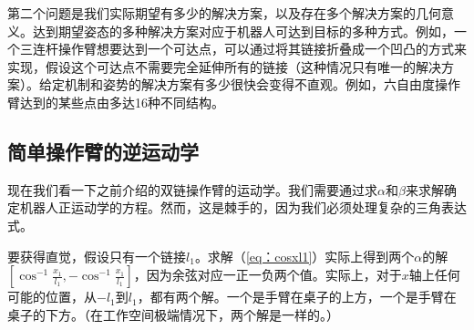 第二个问题是我们实际期望有多少的解决方案，以及存在多个解决方案的几何意义。达到期望姿态的多种解决方案对应于机器人可达到目标的多种方式。例如，一个三连杆操作臂想要达到一个可达点，可以通过将其链接折叠成一个凹凸的方式来实现，假设这个可达点不需要完全延伸所有的链接（这种情况只有唯一的解决方案）。给定机制和姿势的解决方案有多少很快会变得不直观。例如，六自由度操作臂达到的某些点由多达16种不同结构。



\subsection{简单操作臂的逆运动学}
现在我们看一下之前介绍的双链操作臂的运动学。我们需要通过求$\alpha$和$\beta$来求解确定机器人正运动学的方程。然而，这是棘手的，因为我们必须处理复杂的三角表达式。

要获得直觉，假设只有一个链接$l_1$。求解（\ref{eq：cosxl1}）实际上得到两个$\alpha$的解$\left[\cos^{-1}\frac{x_1}{l_1},-\cos^{-1}\frac{x_1}{l_1}\right]$，因为余弦对应一正一负两个值。实际上，对于$x$轴上任何可能的位置，从$-l_1$到$l_1$，都有两个解。一个是手臂在桌子的上方，一个是手臂在桌子的下方。（在工作空间极端情况下，两个解是一样的。）


